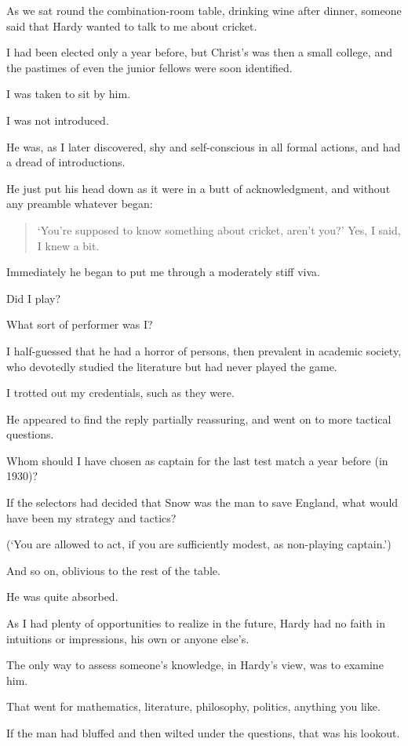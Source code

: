 \documentclass{article}
\numberwithin{equation}{section}
\begin{document}
%
As we sat round the combination-room table, drinking wine after dinner, someone said that Hardy wanted to talk to me about cricket.

I had been elected only a year before, but Christ's was then a small college, and the pastimes of even the junior fellows were soon identified.

I was taken to sit by him.

I was not introduced.

He was, as I later discovered, shy and self-conscious in all formal actions, and had a dread of introductions.

He just put his head down as it were in a butt of acknowledgment, and without any preamble whatever began:
\begin{quotation}
    `You're supposed to know something about cricket, aren't you?' Yes, I said, I knew a bit.
\end{quotation}
Immediately he began to put me through a moderately stiff viva.

Did I play?

What sort of performer was I?

I half-guessed that he had a horror of persons, then prevalent in academic society, who devotedly studied the literature but had never played the game.

I trotted out my credentials, such as they were.

He appeared to find the reply partially reassuring, and went on to more tactical questions.

Whom should I have chosen as captain for the last test match a year before (in 1930)?

If the selectors had decided that Snow was the man to save England, what would have been my strategy and tactics?

(`You are allowed to act, if you are sufficiently modest, as non-playing captain.')

And so on, oblivious to the rest of the table.

He was quite absorbed.

%
As I had plenty of opportunities to realize in the future, Hardy had no faith in intuitions or impressions, his own or anyone else's.

The only way to assess someone's knowledge, in Hardy's view, was to examine him.

That went for mathematics, literature, philosophy, politics, anything you like.

If the man had bluffed and then wilted under the questions, that was his lookout.
\end{document}
